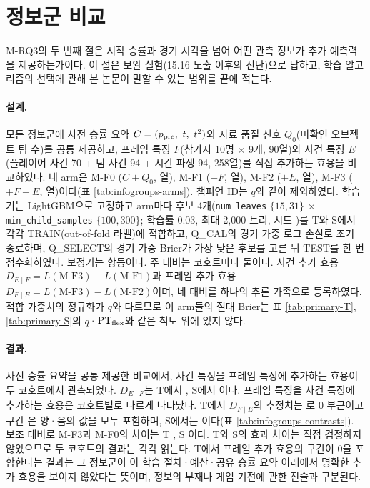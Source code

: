 \section{정보군 비교}
\label{sec:pred-infogroups}

M-RQ3의 두 번째 절은 시작 승률과 경기 시각을 넘어 어떤 관측 정보가 추가 예측력을 제공하는가이다. 이 절은 보완 실험(15.16 노출 이후의 진단)으로 답하고, 학습 알고리즘의 선택에 관해 본 논문이 말할 수 있는 범위를 끝에 적는다.

\paragraph{설계.} 모든 정보군에 사전 승률 요약 $C = (\ppre,\ t,\ t^2)$와 자료 품질 신호 $Q_0$(미확인 오브젝트 팀 수)를 공통 제공하고, 프레임 특징 $F$(참가자 10명 $\times$ 9개, 90열)와 사건 특징 $E$(플레이어 사건 70 + 팀 사건 94 + 시간 파생 94, 258열)를 직접 추가하는 효용을 비교하였다. 네 arm은 M-F0 ($C + Q_0$, \igDimFzero{}열), M-F1 ($+F$, \igDimFone{}열), M-F2 ($+E$, \igDimFtwo{}열), M-F3 ($+F+E$, \igDimFthree{}열)이다(표 \ref{tab:infogroups-arms}). 챔피언 ID는 $q$와 같이 제외하였다. 학습기는 LightGBM으로 고정하고 arm마다 후보 4개(\texttt{num\_leaves} $\{15, 31\}$ $\times$ \texttt{min\_child\_samples} $\{100, 300\}$; 학습률 0.03, 최대 2{,}000 트리, 시드 \bootSeed)를 T와 S에서 각각 TRAIN(out-of-fold 라벨)에 적합하고, Q\_CAL의 경기 가중 로그 손실로 조기 종료하며, Q\_SELECT의 경기 가중 Brier가 가장 낮은 후보를 고른 뒤 TEST를 한 번 점수화하였다. 보정기는 항등이다. 주 대비는 코호트마다 둘이다. 사건 추가 효용 $D_{E\mid F} = L(\text{M-F3}) - L(\text{M-F1})$과 프레임 추가 효용 $D_{F\mid E} = L(\text{M-F3}) - L(\text{M-F2})$이며, 네 대비를 하나의 추론 가족으로 등록하였다. 적합 가중치의 정규화가 $q$와 다르므로 이 arm들의 절대 Brier는 표 \ref{tab:primary-T}, \ref{tab:primary-S}의 $q$·$\mathrm{PT}_{\mathrm{flex}}$와 같은 척도 위에 있지 않다.



\paragraph{결과.} 사전 승률 요약을 공통 제공한 비교에서, 사건 특징을 프레임 특징에 추가하는 효용이 두 코호트에서 관측되었다. $D_{E\mid F}$는 T에서 \igTDEgF{} \ci{\igTDEgFLo}{\igTDEgFHi}, S에서 \igSDEgF{} \ci{\igSDEgFLo}{\igSDEgFHi}이다. 프레임 특징을 사건 특징에 추가하는 효용은 코호트별로 다르게 나타났다. T에서 $D_{F\mid E}$의 추정치는 \igTDFgE{}로 0 부근이고 구간 \ci{\igTDFgELo}{\igTDFgEHi}은 양·음의 값을 모두 포함하며, S에서는 \igSDFgE{} \ci{\igSDFgELo}{\igSDFgEHi}이다(표 \ref{tab:infogroups-contrasts}). 보조 대비로 M-F3과 M-F0의 차이는 T \igTFthreeVsFzero{} \ci{\igTFthreeVsFzeroLo}{\igTFthreeVsFzeroHi}, S \igSFthreeVsFzero{} \ci{\igSFthreeVsFzeroLo}{\igSFthreeVsFzeroHi}이다. T와 S의 효과 차이는 직접 검정하지 않았으므로 두 코호트의 결과는 각각 읽는다. T에서 프레임 추가 효용의 구간이 0을 포함한다는 결과는 그 정보군이 이 학습 절차·예산·공유 승률 요약 아래에서 명확한 추가 효용을 보이지 않았다는 뜻이며, 정보의 부재나 게임 기전에 관한 진술과 구분된다.

